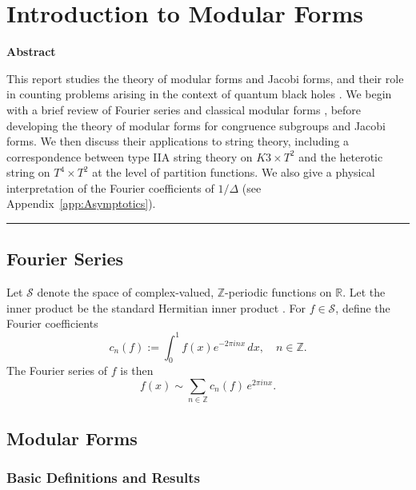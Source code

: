 
\chapter{Introduction to Modular Forms}

\vspace{-1em}
\begin{center}
\large\textbf{Abstract}
\end{center}

\noindent
This report studies the theory of modular forms and Jacobi forms, and their role in counting problems arising in the context of quantum black holes \cite{DMZ}. We begin with a brief review of Fourier series \cite{BrownNotes} and classical modular forms \cite{DiamondShurman}, before developing the theory of modular forms for congruence subgroups and Jacobi forms. We then discuss their applications to string theory, including a correspondence between type IIA string theory on $K3 \times T^2$ and the heterotic string on $T^4 \times T^2$ at the level of partition functions. We also give a physical interpretation of the Fourier coefficients of $1/\Delta$ (see Appendix~\ref{app:Asymptotics}).

\vspace{0.5em}
\noindent\rule{\textwidth}{0.4pt}


\section{Fourier Series}

Let $\mathcal{S}$ denote the space of complex-valued, $\mathbb{Z}$-periodic functions on $\mathbb{R}$. Let the inner product be the standard Hermitian inner product \cite[Section~1.2]{BrownNotes}. For $f \in \mathcal{S}$, define the Fourier coefficients
\[
c_n(f) := \int_0^1 f(x)e^{-2\pi i n x}\,dx, \quad n \in \mathbb{Z}.
\]
The Fourier series of $f$ is then
\[
f(x) \sim \sum_{n\in\mathbb{Z}} c_n(f)\,e^{2\pi i n x}.
\]

\section{Modular Forms}
\subsection{Basic Definitions and Results}

